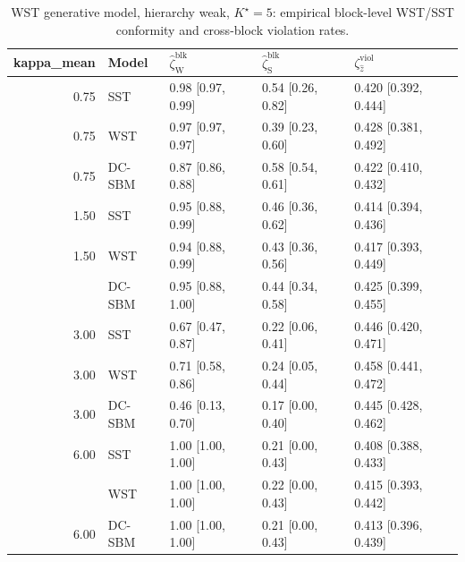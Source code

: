 \begin{table}
\centering
\caption{WST generative model, hierarchy weak, $K^\star=5$: empirical block-level WST/SST conformity and cross-block violation rates.}
\centering
\begin{tabular}[t]{rllll}
\toprule
kappa_mean & Model & $\widehat\zeta_{\mathrm{W}}^{\mathrm{blk}}$ & $\widehat\zeta_{\mathrm{S}}^{\mathrm{blk}}$ & $\zeta^{\mathrm{viol}}_{\hat z}$\\
\midrule
0.75 & SST & 0.98 [0.97, 0.99] & 0.54 [0.26, 0.82] & 0.420 [0.392, 0.444]\\
0.75 & WST & 0.97 [0.97, 0.97] & 0.39 [0.23, 0.60] & 0.428 [0.381, 0.492]\\
0.75 & DC-SBM & 0.87 [0.86, 0.88] & 0.58 [0.54, 0.61] & 0.422 [0.410, 0.432]\\
1.50 & SST & 0.95 [0.88, 0.99] & 0.46 [0.36, 0.62] & 0.414 [0.394, 0.436]\\
1.50 & WST & 0.94 [0.88, 0.99] & 0.43 [0.36, 0.56] & 0.417 [0.393, 0.449]\\
\addlinespace
1.50 & DC-SBM & 0.95 [0.88, 1.00] & 0.44 [0.34, 0.58] & 0.425 [0.399, 0.455]\\
3.00 & SST & 0.67 [0.47, 0.87] & 0.22 [0.06, 0.41] & 0.446 [0.420, 0.471]\\
3.00 & WST & 0.71 [0.58, 0.86] & 0.24 [0.05, 0.44] & 0.458 [0.441, 0.472]\\
3.00 & DC-SBM & 0.46 [0.13, 0.70] & 0.17 [0.00, 0.40] & 0.445 [0.428, 0.462]\\
6.00 & SST & 1.00 [1.00, 1.00] & 0.21 [0.00, 0.43] & 0.408 [0.388, 0.433]\\
\addlinespace
6.00 & WST & 1.00 [1.00, 1.00] & 0.22 [0.00, 0.43] & 0.415 [0.393, 0.442]\\
6.00 & DC-SBM & 1.00 [1.00, 1.00] & 0.21 [0.00, 0.43] & 0.413 [0.396, 0.439]\\
\bottomrule
\end{tabular}
\end{table}
